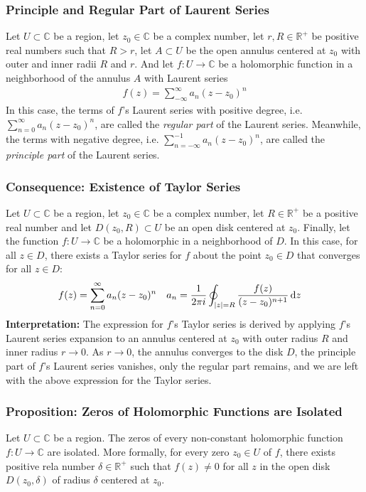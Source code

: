 \documentclass[11pt, a4paper]{article}
\newcommand{\diff}{\mathop{}\!\mathrm{d}} %
\newcommand{\R}{\mathbb{R}} %
\newcommand{\C}{\mathbb{C}} %
\begin{document}
\subsubsection{Principle and Regular Part of Laurent Series}
Let $ U \subset \C $ be a region, let $ z_0 \in \C $ be a complex number, let $ r, R \in \R^+ $ be positive real numbers such that $ R > r $, let $ A \subset U $ be the open annulus centered at $ z_0 $ with outer and inner radii $ R $ and $ r $. And let $ f : U \to \C $ be a holomorphic function in a neighborhood of the annulus $ A $ with Laurent series
\begin{align*}
	f(z) = \sum_{-\infty}^{\infty} a_n (z - z_0)^{n}
\end{align*}
In this case, the terms of $ f $'s Laurent series with positive degree, i.e. $ \displaystyle{\sum_{n=0}^{\infty} a_n (z - z_0)^{n}} $, are called the \textit{regular part} of the Laurent series. Meanwhile, the terms with negative degree, i.e. $ \displaystyle{	\sum_{n=-\infty}^{-1} a_n (z - z_0)^{n}} $, are called the \textit{principle part} of the Laurent series.

\subsubsection{Consequence: Existence of Taylor Series}
Let $ U \subset \C $ be a region, let $ z_0 \in \C $ be a complex number, let $ R \in \R^+ $ be a positive real number and let $ D(z_0, R) \subset U $ be an open disk centered at $ z_0 $. Finally, let the function $ f : U \to \C $ be a holomorphic in a neighborhood of $ D $. In this case, for all $ z \in D $, there exists a Taylor series for $ f $ about the point $ z_0 \in D $ that converges for all $ z \in D $:
\begin{align*}
	& f(z) = \sum_{n = 0}^{\infty}a_n (z-z_0)^n && a_n = \frac{1}{2\pi i} \oint_{\abs{z}=R} \frac{f(z)}{(z - z_0)^{n+1}} \diff z
\end{align*}
\textbf{Interpretation:} The expression for $ f $'s Taylor series is derived by applying $ f $'s Laurent series expansion to an annulus centered at $ z_0 $ with outer radius $ R $ and inner radius $ r \to 0 $. As $ r \to 0 $, the annulus converges to the disk $ D $, the principle part of $ f $'s Laurent series vanishes, only the regular part remains, and we are left with the above expression for the Taylor series.

\subsubsection{Proposition: Zeros of Holomorphic Functions are Isolated}
Let $ U \subset \C $ be a region. The zeros of every non-constant holomorphic function $ f: U \to \C $ are isolated. More formally, for every zero $ z_0 \in U $ of $ f $, there exists positive rela number $ \delta \in \R^{+} $ such that $ f(z) \neq 0 $ for all $ z $ in the open disk $ D(z_0, \delta) $ of radius $ \delta $ centered at $ z_0 $.
\end{document}
